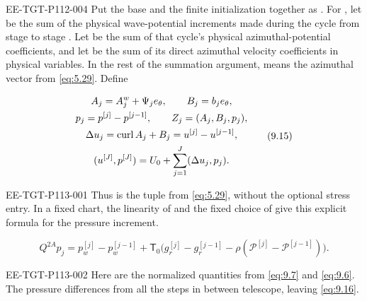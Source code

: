 \begin{EESegment}{EE-TGT-P112-004}
Put the base and the finite initialization together as
. For , let
 be the sum of the physical wave-potential increments made during the
cycle from stage  to stage . Let
 be the sum of that cycle's physical azimuthal-potential coefficients,
and let  be the sum of its direct azimuthal velocity coefficients in
physical variables. In the rest of the summation argument,
 means the azimuthal vector from \eqref{eq:5.29}. Define
\end{EESegment}
\begin{equation}
\begin{gathered}
A_j=A_j^w+\Psi_je_\theta,
\qquad B_j=b_je_\theta,\\
p_j=p^{[j]}-p^{[j-1]},
\qquad Z_j=(A_j,B_j,p_j),\\
\Delta u_j=\operatorname{curl} A_j+B_j=u^{[j]}-u^{[j-1]},\\
(u^{[J]},p^{[J]})=U_0+\sum_{j=1}^{J}(\Delta u_j,p_j).
\end{gathered}
\tag{9.15}\label{eq:9.15}
\end{equation}
%
\begin{EESegment}{EE-TGT-P113-001}
Thus  is the tuple from \eqref{eq:5.29}, without the optional stress
entry. In a fixed  chart, the linearity of
 and the fixed choice of  give this
explicit formula for the pressure increment.
\end{EESegment}
\begin{equation}
Q^{2A}p_j=p_w^{[j]}-p_w^{[j-1]}
 +\mathsf T_0\bigl(g_r^{[j]}-g_r^{[j-1]}-\rho(\mathcal P^{[j]}-\mathcal P^{[j-1]})\bigr).
\tag{9.16}\label{eq:9.16}
\end{equation}
\begin{EESegment}{EE-TGT-P113-002}
Here  are the normalized quantities
from \eqref{eq:9.7} and \eqref{eq:9.6}. The pressure differences from all the steps in between
telescope, leaving \eqref{eq:9.16}.
\end{EESegment}


